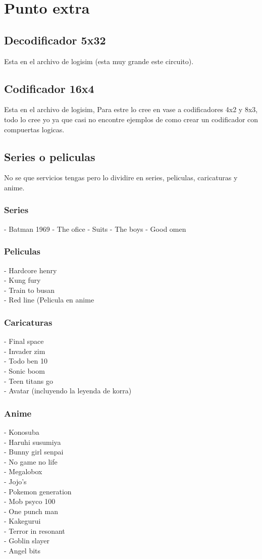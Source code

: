 \documentclass{article}
\begin{document}
\section{Punto extra}
\subsection{Decodificador 5x32}
Esta en el archivo de logisim (esta muy grande este circuito).

\subsection{Codificador 16x4}
Esta en el archivo de logisim, Para estre lo cree en vase a codificadores 4x2 y 8x3, todo lo cree yo ya que casi no encontre ejemplos de como crear un codificador con compuertas logicas.

\subsection{Series o peliculas}
No se que servicios tengas pero lo dividire en series, peliculas, caricaturas y anime.
\subsubsection{Series}
- Batman 1969
- The ofice
- Suits
- The boys
- Good omen

\subsubsection{Peliculas}
- Hardcore henry\\
- Kung fury\\
- Train to busan\\
- Red line (Pelicula en anime

\subsubsection{Caricaturas}
- Final space\\
- Invader zim\\
- Todo ben 10\\
- Sonic boom\\
- Teen titans go\\
- Avatar (incluyendo la leyenda de korra)

\subsubsection{Anime}
- Konosuba\\
- Haruhi susumiya\\
- Bunny girl senpai\\
- No game no life\\
- Megalobox\\
- Jojo's\\
- Pokemon generation\\
- Mob psyco 100\\
- One punch man\\
- Kakegurui\\
- Terror in resonant\\
- Goblin slayer\\
- Angel bits
\end{document}
